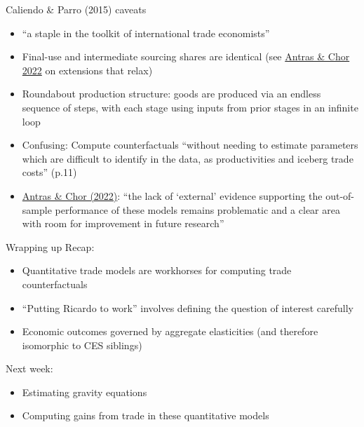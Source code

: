 \documentclass[11pt,notes=hide,aspectratio=169]{beamer}
\begin{document}
\begin{frame}{Caliendo \& Parro (2015) caveats}
\begin{itemize}
\item ``a staple in the toolkit of international trade economists''
\item Final-use and intermediate sourcing shares are identical (see \href{https://doi.org/10.1016/bs.hesint.2022.02.005}{Antras \& Chor 2022} on extensions that relax)
\item Roundabout production structure:
goods are produced via an endless sequence of steps, with each stage using inputs from prior stages in an infinite loop
\item Confusing: Compute counterfactuals ``without needing to estimate parameters which are difficult to identify in the data, as productivities and iceberg trade costs'' (p.11)
\item \href{https://doi.org/10.1016/bs.hesint.2022.02.005}{Antras \& Chor (2022)}:
``the lack of `external' evidence supporting the out-of-sample performance of these models remains problematic and a clear area with room for improvement in future research''
\end{itemize}
\end{frame}
\begin{frame}{Wrapping up}
Recap:
\begin{itemize}
\item Quantitative trade models are workhorses for computing trade counterfactuals
\item ``Putting Ricardo to work'' involves defining the question of interest carefully
\item Economic outcomes governed by aggregate elasticities (and therefore isomorphic to CES siblings)
\end{itemize}
Next week:
\begin{itemize}
\item Estimating gravity equations
\item Computing gains from trade in these quantitative models
\end{itemize}
\end{frame}
\end{document}
